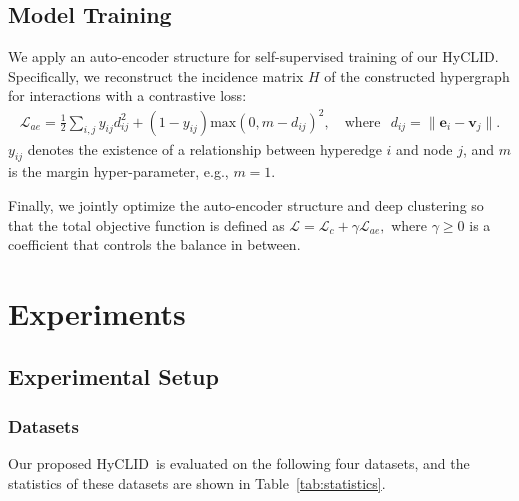 \documentclass[11pt]{article}
\def\modelname{HyCLID}
\begin{document}
\subsection{Model Training}
We apply an auto-encoder structure for self-supervised training of our \modelname. Specifically, we reconstruct the incidence matrix $ H $ of the constructed hypergraph for interactions with a contrastive loss:
\begin{align}
	\mathcal{L}_{ae} = \frac{1}{2} \sum_{i, j} y_{ij} d_{ij}^2 + (1-y_{ij}) \text{max}(0, m - d_{ij})^2  , \quad
	\text{where } \ \, {d}_{ij} = \| \boldsymbol e_i - \boldsymbol v_j \|  .
\end{align}
$ y_{ij} $ denotes the existence of a relationship between hyperedge $ i $ and node $ j $, and $ m $ is the margin hyper-parameter, e.g., $ m = 1 $.

Finally, we jointly optimize the auto-encoder structure and deep clustering so that the total objective function is defined as
$
\mathcal{L} = \mathcal{L}_{c} + \gamma \mathcal L_{ae},
$
where $ \gamma \geqslant 0 $ is a coefficient that controls the balance in between.


\section{Experiments}       \label{sec:experiment}

\subsection{Experimental Setup}		\label{exp:setup}
\subsubsection{Datasets}


Our proposed \modelname~is evaluated on the following four datasets, and the statistics of these datasets are shown in Table~\ref{tab:statistics}.
\end{document}
